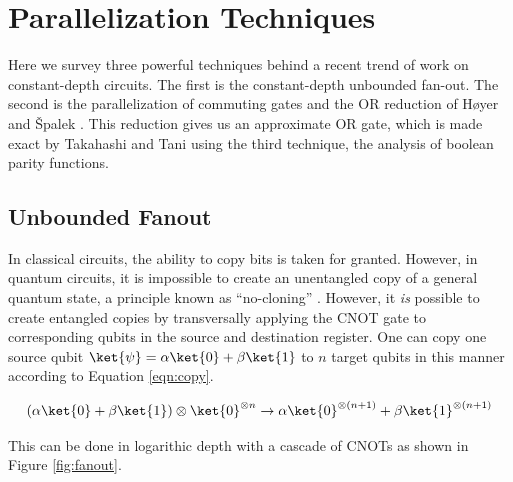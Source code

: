 \section{Parallelization Techniques}
\label{sec:parallel}

Here we survey three powerful techniques behind a recent trend of work on
constant-depth circuits. The first is the constant-depth unbounded fan-out.
The second is the parallelization of
commuting gates and the \textsc{OR} reduction of H{\o}yer and {\v S}palek
\cite{Hoyer2002}. This reduction gives us an approximate \textsc{OR} gate,
which is made exact by Takahashi and Tani \cite{Takahashi2011} using the
third technique, the analysis of boolean parity functions.

\subsection{Unbounded Fanout}

In classical
circuits, the ability to copy bits is taken for granted. However,
in quantum circuits,
it is impossible to create an unentangled copy of a general quantum state, a
principle known as ``no-cloning'' \cite{Nielsen2000}. However,
it \emph{is} possible to create entangled copies by transversally applying
the CNOT gate to corresponding qubits in the source and destination register.
One can copy one source qubit $\ket{\psi} = \alpha \ket{0} + \beta \ket{1}$
to $n$ target qubits in this manner according to Equation \ref{eqn:copy}.

\begin{equation}
(\alpha \ket{0} + \beta \ket{1}) \otimes \ket{0}^{\otimes n} \rightarrow
\alpha \ket{0}^{\otimes (n+1)} + \beta \ket{1}^{\otimes (n+1)}
\label{eqn:copy}
\end{equation}

This can be done in logarithic depth with a cascade of CNOTs as shown
in Figure \ref{fig:fanout}.

